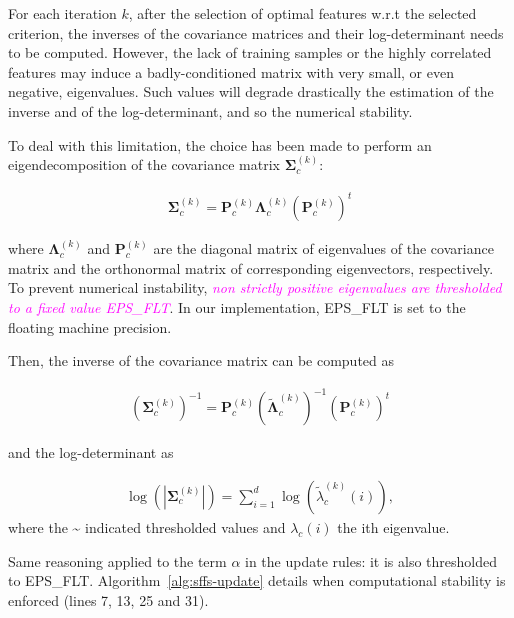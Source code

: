 \documentclass[journal,10pt]{IEEEtran}
\newcommand{\rev}[1]{\textcolor{magenta}{\emph{#1}}}
\begin{document}
    For each  iteration $k$, after  the selection of  optimal features
    w.r.t  the  selected criterion,  the  inverses  of the  covariance
    matrices and their log-determinant  needs to be computed. However,
    the lack of training samples or the highly correlated features may
    induce  a  badly-conditioned  matrix  with  very  small,  or  even
    negative, eigenvalues.   Such values will degrade  drastically the
    estimation of the  inverse and of the log-determinant,  and so the
    numerical stability.

    To deal with this limitation, the choice has been made to perform an eigendecomposition of the covariance matrix $\boldsymbol{\Sigma}^{(k)}_c$:

    \begin{eqnarray}
    \boldsymbol{\Sigma}^{(k)}_c = \mathbf{P}^{(k)}_c \boldsymbol{\Lambda}^{(k)}_c (\mathbf{P}^{(k)}_c)^t\label{eq:eigendecomp}
    \end{eqnarray}


    where $\boldsymbol{\Lambda}^{(k)}_c$  and $\mathbf{P}^{(k)}_c$ are
    the diagonal  matrix of eigenvalues  of the covariance  matrix and
    the    orthonormal   matrix    of   corresponding    eigenvectors,
    respectively.  To prevent numerical instability, \rev{non strictly
      positive eigenvalues are thresholded to a fixed value EPS\_FLT}.
    In our  implementation, EPS\_FLT  is set  to the  floating machine
    precision.

    Then, the inverse of the covariance matrix can be computed as

    \begin{eqnarray}
      (\boldsymbol{\Sigma}^{(k)}_c)^{-1} = \mathbf{P}^{(k)}_c (\tilde{\boldsymbol{\Lambda}}^{(k)}_c)^{-1} (\mathbf{P}^{(k)}_c)^t\label{eq:eigendecomp:inv}
    \end{eqnarray}

    and the log-determinant as

    \begin{eqnarray}
      \label{eq:log:det}
      \log \left(|\boldsymbol{\Sigma}_c^{(k)}|\right) = \sum_{i=1}^d\log(\tilde{\lambda}_{c}^{(k)}(i)),
    \end{eqnarray}
    where the \textasciitilde{} indicated thresholded values and $\lambda_{c}(i)$ the ith eigenvalue.

    Same reasoning applied  to the term $\alpha$ in  the update rules:
    it       is       also        thresholded       to       EPS\_FLT.
    Algorithm~\ref{alg:sffs-update}    details   when    computational
    stability is enforced (lines 7, 13, 25 and 31).
\end{document}
